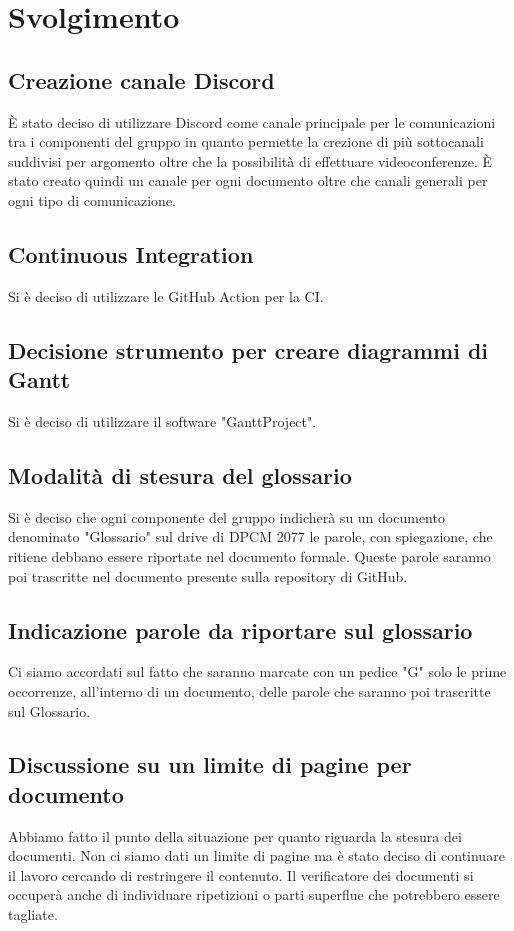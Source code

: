 \section*{Svolgimento}
\subsection*{Creazione canale Discord}
È stato deciso di utilizzare Discord come canale principale per le comunicazioni tra i componenti del gruppo in quanto permette la crezione di più sottocanali suddivisi per argomento oltre che la possibilità di effettuare videoconferenze. È stato creato quindi un canale per ogni documento oltre che canali generali per ogni tipo di comunicazione.

\subsection*{Continuous Integration}
Si è deciso di utilizzare le GitHub Action per la CI.

\subsection*{Decisione strumento per creare diagrammi di Gantt}
Si è deciso di utilizzare il software "GanttProject".
			
\subsection*{Modalità di stesura del glossario}
Si è deciso che ogni componente del gruppo indicherà su un documento denominato "Glossario" sul drive di DPCM 2077 le parole, con spiegazione, che ritiene debbano essere riportate nel documento formale. 
Queste parole saranno poi trascritte nel documento presente sulla repository di GitHub.

\subsection*{Indicazione parole da riportare sul glossario}
Ci siamo accordati sul fatto che saranno marcate con un pedice "G" solo le prime occorrenze, all'interno di un documento, delle parole che saranno poi trascritte sul Glossario.

\subsection*{Discussione su un limite di pagine per documento}
Abbiamo fatto il punto della situazione per quanto riguarda la stesura dei documenti. Non ci siamo dati un limite di pagine ma è stato deciso di continuare il lavoro cercando di restringere il contenuto. Il verificatore dei documenti si occuperà anche di individuare ripetizioni o parti superflue che potrebbero essere tagliate.

